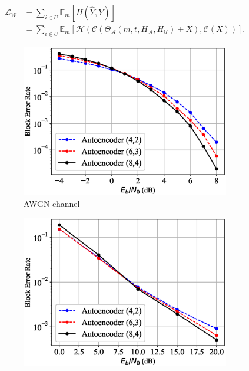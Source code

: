 \begin{equation}
	\begin{aligned} \label{multi_willie_loss}
		\mathcal{L}_{\mathcal{W}} & = 
		\sum_{i \in U} \mathbb{E}_{m}[H(\hat{Y}, Y)] \\
		& = \sum_{i \in U}
			\mathbb{E}_{m}[\mathcal{H}(\mathcal{C}(\Theta_{\mathcal{A}}(m, t, H_{\mathcal{A}}, H_{\mathcal{U}}) + X), \mathcal{C}(X))].
	\end{aligned}
\end{equation}

\begin{figure}[!tp]
	\center
	\begin{subfigure}{0.28\textwidth}
		\includegraphics[width=\linewidth]{figs/autoencoder_bler_awgn}
		\caption{AWGN channel}
	\end{subfigure}
	\begin{subfigure}{0.28\textwidth}
		\includegraphics[width=\linewidth]{figs/autoencoder_bler_rician}

\end{subfigure}
\end{figure}
